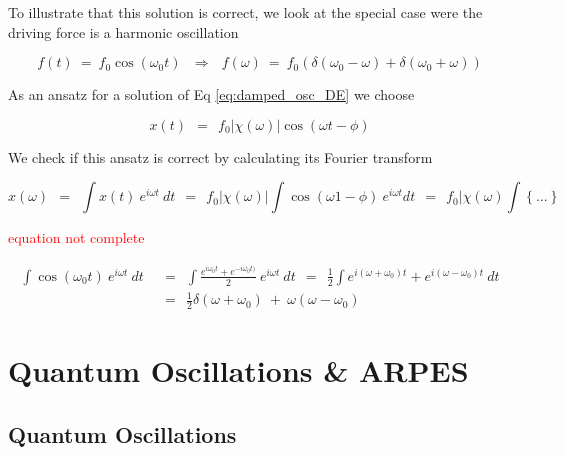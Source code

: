 \documentclass[10pt]{report}
\numberwithin{equation}{chapter}
\newcommand{\refEq}[1]{
  Eq  \ref{#1}
}
\begin{document}
To illustrate that this solution is correct, we look at the special case were the driving force is a harmonic oscillation

\begin{equation}
  f(t) ~=~ f_0 \cos(\omega_0 t) ~~~\Rightarrow~~~ f(\omega) 
  ~=~ f_0 \left( \delta(\omega_0 - \omega) + \delta(\omega_0 + \omega) \right)
\end{equation}


As an ansatz for a solution of \refEq{eq:damped_osc_DE} we choose

\begin{equation}
  x(t) ~~=~~ f_0 | \chi(\omega) | \cos(\omega t - \phi)
\end{equation}


We check if this ansatz is correct by calculating its Fourier transform

\begin{equation}
  x(\omega) ~~=~~ \int x(t)\ e^{i\omega t}\ dt 
  ~~=~~ f_0 |\chi(\omega)| \int \cos(\omega 1 - \phi)\ e^{i\omega t} dt 
  ~~=~~ f_0 | \chi(\omega) \int \left\{... \right\} 
\end{equation}

\textcolor{red}{equation not complete}


\begin{align}
  \int \cos(\omega_0 t)\ e^{i\omega t}\ dt 
  ~~& =~~ \int \frac{e^{i\omega_0 t} + e^{-i\omega_0 t)}}{2}\ e^{i\omega t}\ dt
  ~~=~~ \frac{1}{2} \int e^{i(\omega + \omega_0)t} + e^{i(\omega - \omega_0)t}\ dt\nonumber \\
  ~~& =~~ \frac{1}{2} \delta(\omega + \omega_0) ~+~ \omega(\omega - \omega_0)
\end{align}



%

\chapter{Quantum Oscillations \& ARPES}



%
\section{Quantum Oscillations}
\end{document}
